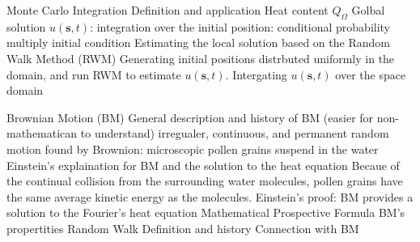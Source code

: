 \documentclass{article}
\begin{document}
\begin{outline}[enumerate]


  
  \1 Monte Carlo Integration
     \2 Definition and application
     \2 Heat content $Q_{\Omega}$
        \3 Golbal solution $u(\bm{s}, t)$: integration over the initial position: conditional probability multiply initial condition
           \4 Estimating the local solution based on the Random Walk Method (RWM)
           \4 Generating initial positions distrbuted uniformly in the domain, and run RWM to estimate  $u(\bm{s}, t)$.
        \3 Intergating $u(\bm{s}, t)$ over the space domain

     

  \1 Brownian Motion (BM)
    \2 General description and history of BM (easier for non-mathematican to understand)
      \3 irregualer, continuous, and permanent random motion found by Brownion: microscopic pollen grains suspend in the water
      \3 Einstein's explaination for BM and the solution to the heat equation
         \4 Becaue of the continual collision from the surrounding water molecules, pollen grains have the same average kinetic energy as the molecules.
         \4 Einstein's proof: BM provides a solution to the Fourier's heat equation    
    \2 Mathematical Prospective
      \3 Formula   
      \3 BM's propertities
    \2 Random Walk
      \3 Definition and history
      \3 Connection with BM

     


\end{outline}
\end{document}

